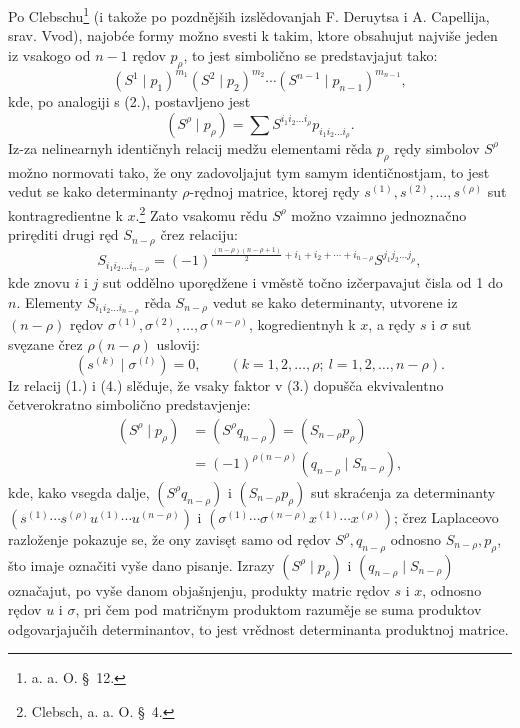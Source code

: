 \documentclass[11pt]{article}
\begin{document}
Po Clebschu\footnote{a. a. O. \S\ 12.} (i takože po pozdnějših izslědovanjah F. Deruytsa i A. Capellija, srav. Vvod), najobće formy možno svesti k takim, ktore obsahujut najviše jeden iz vsakogo od $n-1$ rędov $p_\rho$, to jest simbolično se predstavjajut tako:
\begin{equation}
 (S^1\mid p_1)^{m_1}(S^2\mid p_2)^{m_2}\cdots(S^{n-1}\mid p_{n-1})^{m_{n-1}},
\tag{3}
\end{equation}
kde, po analogiji s (2.), postavljeno jest
\[
 (S^\rho\mid p_\rho)=\sum S^{i_1i_2\ldots i_\rho}p_{i_1i_2\ldots i_\rho}.
\]
Iz-za nelinearnyh identičnyh relacij medžu elementami rěda $p_\rho$ rędy simbolov $S^\rho$ možno normovati tako, že ony zadovoljajut tym samym identičnostjam, to jest vedut se kako determinanty $\rho$-rędnoj matrice, ktorej rędy $s^{(1)},s^{(2)},\ldots,s^{(\rho)}$ sut kontragredientne k $x$.\footnote{Clebsch, a. a. O. \S\ 4.} Zato vsakomu rědu $S^\rho$ možno vzaimno jednoznačno priręditi drugi ręd $S_{n-\rho}$ črez relaciju:
\begin{equation}
 S_{i_1i_2\ldots i_{n-\rho}}=(-1)^{\frac{(n-\rho)(n-\rho+1)}2+i_1+i_2+\cdots+i_{n-\rho}}S^{j_1j_2\ldots j_\rho},
\tag{4}
\end{equation}
kde znovu $i$ i $j$ sut oddělno uporędžene i vměstě točno izčerpavajut čisla od 1 do $n$. Elementy $S_{i_1i_2\ldots i_{n-\rho}}$ rěda $S_{n-\rho}$ vedut se kako determinanty, utvorene iz $(n-\rho)$ rędov $\sigma^{(1)},\sigma^{(2)},\ldots,\sigma^{(n-\rho)}$, kogredientnyh k $x$, a rędy $s$ i $\sigma$ sut svęzane črez $\rho(n-\rho)$ uslovij:
\begin{equation}
 (s^{(k)}\mid \sigma^{(l)})=0,\qquad(k=1,2,\ldots,\rho;\ l=1,2,\ldots,n-\rho).
\tag{5}
\end{equation}
Iz relacij (1.) i (4.) slěduje, že vsaky faktor v (3.) dopušča ekvivalentno četverokratno simbolično predstavjenje:
\begin{equation}
\begin{aligned}
 (S^\rho\mid p_\rho)&=(S^\rho q_{n-\rho})=(S_{n-\rho}p_\rho)\\
 &=(-1)^{\rho(n-\rho)}(q_{n-\rho}\mid S_{n-\rho}),
\end{aligned}
\tag{6}
\end{equation}
kde, kako vsegda dalje, $(S^\rho q_{n-\rho})$ i $(S_{n-\rho}p_\rho)$ sut skraćenja za determinanty $(s^{(1)}\cdots s^{(\rho)}u^{(1)}\cdots u^{(n-\rho)})$ i $(\sigma^{(1)}\cdots\sigma^{(n-\rho)}x^{(1)}\cdots x^{(\rho)})$; črez Laplaceovo razloženje pokazuje se, že ony zavisęt samo od rędov $S^\rho,q_{n-\rho}$ odnosno $S_{n-\rho},p_\rho$, što imaje označiti vyše dano pisanje. Izrazy $(S^\rho\mid p_\rho)$ i $(q_{n-\rho}\mid S_{n-\rho})$ označajut, po vyše danom objašnjenju, produkty matric rędov $s$ i $x$, odnosno rędov $u$ i $\sigma$, pri čem pod matričnym produktom razuměje se suma produktov odgovarjajučih determinantov, to jest vrědnost determinanta produktnoj matrice.
\end{document}
